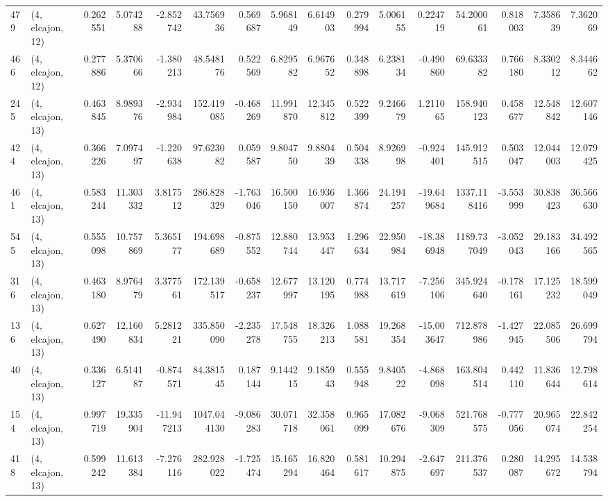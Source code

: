 \begin{tabular}{llrrrrrrrrrrrrrr}
479 &  (4, elcajon, 12) &   0.262551 &   5.074288 &  -2.852742 &    43.756936 &   0.569687 &   5.968149 &   6.614903 &  0.279994 &   5.006155 &   0.224719 &    54.200061 &  0.818003 &   7.358639 &   7.362069 \\
466 &  (4, elcajon, 12) &   0.277886 &   5.370666 &  -1.380213 &    48.548176 &   0.522569 &   6.829582 &   6.967652 &  0.348898 &   6.238134 &  -0.490860 &    69.633382 &  0.766180 &   8.330212 &   8.344662 \\
245 &  (4, elcajon, 13) &   0.463845 &   8.989376 &  -2.934984 &   152.419085 &  -0.468269 &  11.991870 &  12.345812 &  0.522399 &   9.246679 &   1.211065 &   158.940123 &  0.458677 &  12.548842 &  12.607146 \\
424 &  (4, elcajon, 13) &   0.366226 &   7.097497 &  -1.220638 &    97.623082 &   0.059587 &   9.804750 &   9.880439 &  0.504338 &   8.926998 &  -0.924401 &   145.912515 &  0.503047 &  12.044003 &  12.079425 \\
461 &  (4, elcajon, 13) &   0.583244 &  11.303332 &   3.817512 &   286.828329 &  -1.763046 &  16.500150 &  16.936007 &  1.366874 &  24.194257 & -19.649684 &  1337.118416 & -3.553999 &  30.838423 &  36.566630 \\
545 &  (4, elcajon, 13) &   0.555098 &  10.757869 &   5.365177 &   194.698689 &  -0.875552 &  12.880744 &  13.953447 &  1.296634 &  22.950984 & -18.386948 &  1189.737049 & -3.052043 &  29.183166 &  34.492565 \\
316 &  (4, elcajon, 13) &   0.463180 &   8.976479 &   3.377561 &   172.139517 &  -0.658237 &  12.677997 &  13.120195 &  0.774988 &  13.717619 &  -7.256106 &   345.924640 & -0.178161 &  17.125232 &  18.599049 \\
136 &  (4, elcajon, 13) &   0.627490 &  12.160834 &   5.281221 &   335.850090 &  -2.235278 &  17.548755 &  18.326213 &  1.088581 &  19.268354 & -15.003647 &   712.878986 & -1.427945 &  22.085506 &  26.699794 \\
40  &  (4, elcajon, 13) &   0.336127 &   6.514187 &  -0.874571 &    84.381545 &   0.187144 &   9.144215 &   9.185943 &  0.555948 &   9.840522 &  -4.868098 &   163.804514 &  0.442110 &  11.836644 &  12.798614 \\
154 &  (4, elcajon, 13) &   0.997719 &  19.335904 & -11.947213 &  1047.044130 &  -9.086283 &  30.071718 &  32.358061 &  0.965099 &  17.082676 &  -9.068309 &   521.768575 & -0.777056 &  20.965074 &  22.842254 \\
418 &  (4, elcajon, 13) &   0.599242 &  11.613384 &  -7.276116 &   282.928022 &  -1.725474 &  15.165294 &  16.820464 &  0.581617 &  10.294875 &  -2.647697 &   211.376537 &  0.280087 &  14.295672 &  14.538794 \\

\end{tabular}
